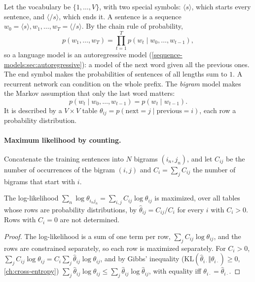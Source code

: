 \begin{notechapter}
Let the vocabulary be $\{1,\dots,V\}$, with two special symbols: $\langle s\rangle$, which starts every sentence, and
$\langle/s\rangle$, which ends it. A sentence is a sequence $w_0 = \langle s\rangle, w_1,\dots,w_T = \langle/s\rangle$. By the chain rule of
probability,
\[
  p(w_1,\dots,w_T) = \prod_{t=1}^Tp(w_t\mid w_0,\dots,w_{t-1}),
\]
so a language model is an autoregressive model (\cref{sequence-models:sec:autoregressive}): a
model of the next word given all the previous ones. The end symbol makes the probabilities
of sentences of all lengths sum to $1$. A recurrent network can condition on the whole prefix.
The \emph{bigram} model makes the Markov assumption that only the last word matters:
\[
  p(w_t\mid w_0,\dots,w_{t-1}) = p(w_t\mid w_{t-1}) .
\]
It is described by a $V\times V$ table $\theta_{ij} = p(\text{next} = j\mid\text{previous} = i)$, each row a probability distribution.

\paragraph{Maximum likelihood by counting.} Concatenate the training sentences into $N$
bigrams $(i_n, j_n)$, and let $C_{ij}$ be the number of occurrences of the bigram $(i, j)$ and $C_i = \sum_jC_{ij}$ the
number of bigrams that start with $i$.

\begin{proposition}\label{bigram-models:prop:counts}
The log-likelihood $\sum_n\log\theta_{i_nj_n} = \sum_{i,j}C_{ij}\log\theta_{ij}$ is maximized, over all tables whose rows are
probability distributions, by $\hat\theta_{ij} = C_{ij}/C_i$ for every $i$ with $C_i > 0$. Rows with $C_i = 0$ are not determined.
\end{proposition}

\begin{proof}
The log-likelihood is a sum of one term per row, $\sum_jC_{ij}\log\theta_{ij}$, and the rows are constrained
separately, so each row is maximized separately. For $C_i > 0$, $\sum_jC_{ij}\log\theta_{ij} = C_i\sum_j\hat\theta_{ij}\log\theta_{ij}$, and by Gibbs'
inequality ($\mathrm{KL}(\hat\theta_{i\cdot}\Vert\theta_{i\cdot})\geq0$, \cref{ch:cross-entropy}) $\sum_j\hat\theta_{ij}\log\theta_{ij}\leq\sum_j\hat\theta_{ij}\log\hat\theta_{ij}$, with equality iff $\theta_{i\cdot} = \hat\theta_{i\cdot}$.
\end{proof}


\end{notechapter}
